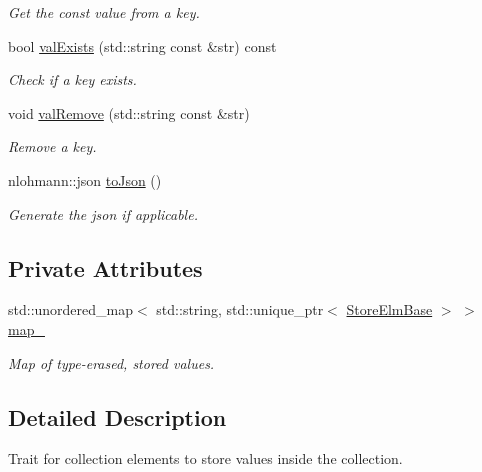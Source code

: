 \begin{DoxyCompactItemize}
\begin{DoxyCompactList}\small\item\em Get the const value from a key. \end{DoxyCompactList}\item 
bool \hyperlink{structvt_1_1vrt_1_1collection_1_1storage_1_1_storable_a46884264a54e5be7fc231208dc468b8e}{val\+Exists} (std\+::string const \&str) const
\begin{DoxyCompactList}\small\item\em Check if a key exists. \end{DoxyCompactList}\item 
void \hyperlink{structvt_1_1vrt_1_1collection_1_1storage_1_1_storable_a760fb8a543d0684b259fdbf078bcafb8}{val\+Remove} (std\+::string const \&str)
\begin{DoxyCompactList}\small\item\em Remove a key. \end{DoxyCompactList}\item 
nlohmann\+::json \hyperlink{structvt_1_1vrt_1_1collection_1_1storage_1_1_storable_afc24cbef1191dfd0457575ddd28b12d9}{to\+Json} ()
\begin{DoxyCompactList}\small\item\em Generate the json if applicable. \end{DoxyCompactList}\end{DoxyCompactItemize}
\subsection*{Private Attributes}
\begin{DoxyCompactItemize}
\item 
std\+::unordered\+\_\+map$<$ std\+::string, std\+::unique\+\_\+ptr$<$ \hyperlink{structvt_1_1vrt_1_1collection_1_1storage_1_1_store_elm_base}{Store\+Elm\+Base} $>$ $>$ \hyperlink{structvt_1_1vrt_1_1collection_1_1storage_1_1_storable_ade35c0e0ef45b53ffad56cbc349cfb82}{map\+\_\+}
\begin{DoxyCompactList}\small\item\em Map of type-\/erased, stored values. \end{DoxyCompactList}\end{DoxyCompactItemize}


\subsection{Detailed Description}
Trait for collection elements to store values inside the collection. 


